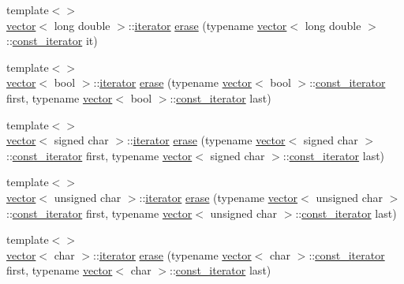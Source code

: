 \begin{DoxyCompactItemize}
\item 
{\footnotesize template$<$$>$ }\\\mbox{\hyperlink{classvector}{vector}}$<$ long double $>$\+::\mbox{\hyperlink{classvector_a35c955cacac6aacaa1e82874b1628865}{iterator}} \mbox{\hyperlink{classvector_ad81ec050b369debbd709a211b5adfeb8}{erase}} (typename \mbox{\hyperlink{classvector}{vector}}$<$ long double $>$\+::\mbox{\hyperlink{classvector_a2fc97dce62b7053449cc868607540dba}{const\+\_\+iterator}} it)
\item 
{\footnotesize template$<$$>$ }\\\mbox{\hyperlink{classvector}{vector}}$<$ bool $>$\+::\mbox{\hyperlink{classvector_a35c955cacac6aacaa1e82874b1628865}{iterator}} \mbox{\hyperlink{classvector_a29009439755e7f667b204d6cc9626c53}{erase}} (typename \mbox{\hyperlink{classvector}{vector}}$<$ bool $>$\+::\mbox{\hyperlink{classvector_a2fc97dce62b7053449cc868607540dba}{const\+\_\+iterator}} first, typename \mbox{\hyperlink{classvector}{vector}}$<$ bool $>$\+::\mbox{\hyperlink{classvector_a2fc97dce62b7053449cc868607540dba}{const\+\_\+iterator}} last)
\item 
{\footnotesize template$<$$>$ }\\\mbox{\hyperlink{classvector}{vector}}$<$ signed char $>$\+::\mbox{\hyperlink{classvector_a35c955cacac6aacaa1e82874b1628865}{iterator}} \mbox{\hyperlink{classvector_a10ce0789a2db33cc8c5bc21ac5684603}{erase}} (typename \mbox{\hyperlink{classvector}{vector}}$<$ signed char $>$\+::\mbox{\hyperlink{classvector_a2fc97dce62b7053449cc868607540dba}{const\+\_\+iterator}} first, typename \mbox{\hyperlink{classvector}{vector}}$<$ signed char $>$\+::\mbox{\hyperlink{classvector_a2fc97dce62b7053449cc868607540dba}{const\+\_\+iterator}} last)
\item 
{\footnotesize template$<$$>$ }\\\mbox{\hyperlink{classvector}{vector}}$<$ unsigned char $>$\+::\mbox{\hyperlink{classvector_a35c955cacac6aacaa1e82874b1628865}{iterator}} \mbox{\hyperlink{classvector_a0962d864a81db04b03e799375a6c7ffb}{erase}} (typename \mbox{\hyperlink{classvector}{vector}}$<$ unsigned char $>$\+::\mbox{\hyperlink{classvector_a2fc97dce62b7053449cc868607540dba}{const\+\_\+iterator}} first, typename \mbox{\hyperlink{classvector}{vector}}$<$ unsigned char $>$\+::\mbox{\hyperlink{classvector_a2fc97dce62b7053449cc868607540dba}{const\+\_\+iterator}} last)
\item 
{\footnotesize template$<$$>$ }\\\mbox{\hyperlink{classvector}{vector}}$<$ char $>$\+::\mbox{\hyperlink{classvector_a35c955cacac6aacaa1e82874b1628865}{iterator}} \mbox{\hyperlink{classvector_a357ed36e761b619903982819801be606}{erase}} (typename \mbox{\hyperlink{classvector}{vector}}$<$ char $>$\+::\mbox{\hyperlink{classvector_a2fc97dce62b7053449cc868607540dba}{const\+\_\+iterator}} first, typename \mbox{\hyperlink{classvector}{vector}}$<$ char $>$\+::\mbox{\hyperlink{classvector_a2fc97dce62b7053449cc868607540dba}{const\+\_\+iterator}} last)

\end{DoxyCompactItemize}
